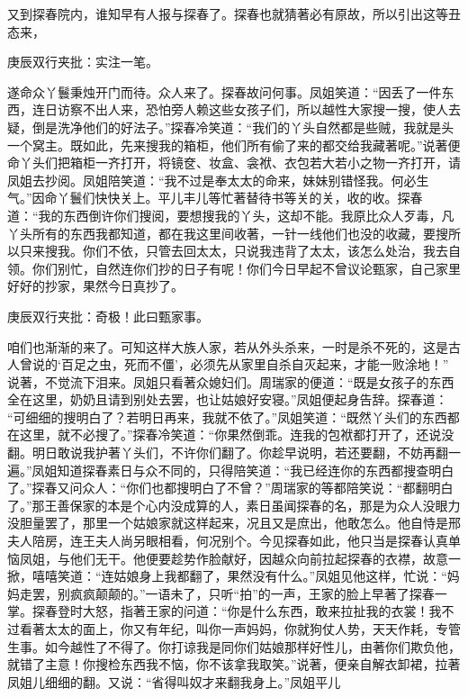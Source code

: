 \begin{parag}


    又到探春院内，谁知早有人报与探春了。探春也就猜著必有原故，所以引出这等丑态来，\begin{note}庚辰双行夹批：实注一笔。\end{note}遂命众丫鬟秉烛开门而待。众人来了。探春故问何事。凤姐笑道：“因丢了一件东西，连日访察不出人来，恐怕旁人赖这些女孩子们，所以越性大家搜一搜，使人去疑，倒是洗净他们的好法子。”探春冷笑道：“我们的丫头自然都是些贼，我就是头一个窝主。既如此，先来搜我的箱柜，他们所有偷了来的都交给我藏著呢。”说著便命丫头们把箱柜一齐打开，将镜奁、妆盒、衾袱、衣包若大若小之物一齐打开，请凤姐去抄阅。凤姐陪笑道：“我不过是奉太太的命来，妹妹别错怪我。何必生气。”因命丫鬟们快快关上。平儿丰儿等忙著替待书等关的关，收的收。探春道：“我的东西倒许你们搜阅，要想搜我的丫头，这却不能。我原比众人歹毒，凡丫头所有的东西我都知道，都在我这里间收著，一针一线他们也没的收藏，要搜所以只来搜我。你们不依，只管去回太太，只说我违背了太太，该怎么处治，我去自领。你们别忙，自然连你们抄的日子有呢！你们今日早起不曾议论甄家，自己家里好好的抄家，果然今日真抄了。\begin{note}庚辰双行夹批：奇极！此曰甄家事。\end{note}咱们也渐渐的来了。可知这样大族人家，若从外头杀来，一时是杀不死的，这是古人曾说的‘百足之虫，死而不僵’，必须先从家里自杀自灭起来，才能一败涂地！” 说著，不觉流下泪来。凤姐只看著众媳妇们。周瑞家的便道：“既是女孩子的东西全在这里，奶奶且请到别处去罢，也让姑娘好安寝。”凤姐便起身告辞。探春道： “可细细的搜明白了？若明日再来，我就不依了。”凤姐笑道：“既然丫头们的东西都在这里，就不必搜了。”探春冷笑道：“你果然倒乖。连我的包袱都打开了，还说没翻。明日敢说我护著丫头们，不许你们翻了。你趁早说明，若还要翻，不妨再翻一遍。”凤姐知道探春素日与众不同的，只得陪笑道：“我已经连你的东西都搜查明白了。”探春又问众人：“你们也都搜明白了不曾？”周瑞家的等都陪笑说：“都翻明白了。”那王善保家的本是个心内没成算的人，素日虽闻探春的名，那是为众人没眼力没胆量罢了，那里一个姑娘家就这样起来，况且又是庶出，他敢怎么。他自恃是邢夫人陪房，连王夫人尚另眼相看，何况别个。今见探春如此，他只当是探春认真单恼凤姐，与他们无干。他便要趁势作脸献好，因越众向前拉起探春的衣襟，故意一掀，嘻嘻笑道：“连姑娘身上我都翻了，果然没有什么。”凤姐见他这样，忙说：“妈妈走罢，别疯疯颠颠的。”一语未了，只听“拍”的一声，王家的脸上早著了探春一掌。探春登时大怒，指著王家的问道：“你是什么东西，敢来拉扯我的衣裳！我不过看著太太的面上，你又有年纪，叫你一声妈妈，你就狗仗人势，天天作耗，专管生事。如今越性了不得了。你打谅我是同你们姑娘那样好性儿，由著你们欺负他，就错了主意！你搜检东西我不恼，你不该拿我取笑。”说著，便亲自解衣卸裙，拉著凤姐儿细细的翻。又说：“省得叫奴才来翻我身上。”凤姐平儿
\end{parag}
